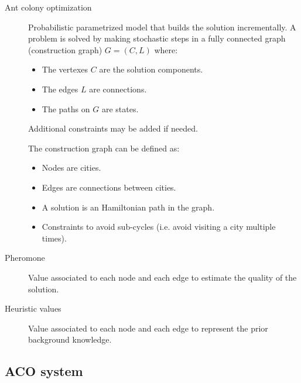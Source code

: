 \begin{description}
    \item[Ant colony optimization] 
        Probabilistic parametrized model that builds the solution incrementally.
        A problem is solved by making stochastic steps in a fully connected graph (construction graph) $G=(C, L)$ where:
        \begin{itemize}
            \item The vertexes $C$ are the solution components.
            \item The edges $L$ are connections.
            \item The paths on $G$ are states.
        \end{itemize}
        Additional constraints may be added if needed.

        \begin{example}
            The construction graph can be defined as:
            \begin{itemize}
                \item Nodes are cities.
                \item Edges are connections between cities.
                \item A solution is an Hamiltonian path in the graph.
                \item Constraints to avoid sub-cycles (i.e. avoid visiting a city multiple times).
            \end{itemize}            
        \end{example}

    \item[Pheromone] 
        Value associated to each node and each edge to estimate the quality of the solution.

    \item[Heuristic values] 
        Value associated to each node and each edge to represent the prior background knowledge.
\end{description}


\subsection{ACO system} 

